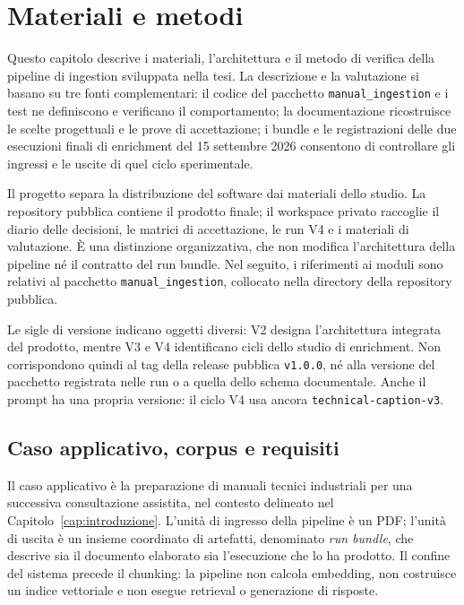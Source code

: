 \chapter{Materiali e metodi}
\label{cap:metodi}

Questo capitolo descrive i materiali, l'architettura e il metodo di verifica della pipeline di ingestion sviluppata nella tesi. La descrizione e la valutazione si basano su tre fonti complementari: il codice del pacchetto \texttt{manual\_ingestion} e i test ne definiscono e verificano il comportamento; la documentazione ricostruisce le scelte progettuali e le prove di accettazione; i bundle e le registrazioni delle due esecuzioni finali di enrichment del 15 settembre 2026 consentono di controllare gli ingressi e le uscite di quel ciclo sperimentale.

Il progetto separa la distribuzione del software dai materiali dello studio. La repository pubblica  contiene il prodotto finale; il workspace privato  raccoglie il diario delle decisioni, le matrici di accettazione, le run V4 e i materiali di valutazione. È una distinzione organizzativa, che non modifica l'architettura della pipeline né il contratto del run bundle. Nel seguito, i riferimenti ai moduli sono relativi al pacchetto \texttt{manual\_ingestion}, collocato nella directory  della repository pubblica.

Le sigle di versione indicano oggetti diversi: V2 designa l'architettura integrata del prodotto, mentre V3 e V4 identificano cicli dello studio di enrichment. Non corrispondono quindi al tag della release pubblica \texttt{v1.0.0}, né alla versione del pacchetto registrata nelle run o a quella dello schema documentale. Anche il prompt ha una propria versione: il ciclo V4 usa ancora \texttt{technical-caption-v3}.

\section{Caso applicativo, corpus e requisiti}

Il caso applicativo è la preparazione di manuali tecnici industriali per una successiva consultazione assistita, nel contesto delineato nel Capitolo~\ref{cap:introduzione}. L'unità di ingresso della pipeline è un PDF; l'unità di uscita è un insieme coordinato di artefatti, denominato \emph{run bundle}, che descrive sia il documento elaborato sia l'esecuzione che lo ha prodotto. Il confine del sistema precede il chunking: la pipeline non calcola embedding, non costruisce un indice vettoriale e non esegue retrieval o generazione di risposte.

